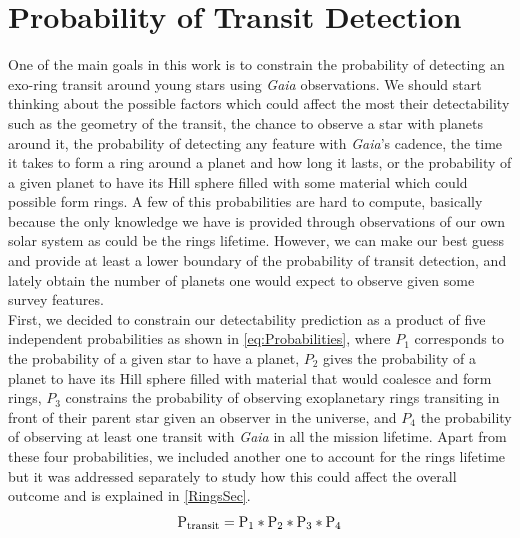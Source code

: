 \section{Probability of Transit Detection}


One of the main goals in this work is to constrain the probability of detecting an exo-ring transit around young stars using \textit{Gaia} observations. We should start thinking about the possible factors which could affect the most their detectability such as the geometry of the transit, the chance to observe a star with planets around it, the probability of detecting any feature with \textit{Gaia}'s cadence, the time it takes to form a ring around a planet and how long it lasts, or the probability of a given planet to have its Hill sphere filled with some material which could possible form rings. A few of this probabilities are hard to compute, basically because the only knowledge we have is provided through observations of our own solar system as could be the rings lifetime. However, we can make our best guess and provide at least a lower boundary of the probability of transit detection, and lately obtain the number of planets one would expect to observe given some survey features.\\

First, we decided to constrain our detectability prediction as a product of five independent probabilities  as shown in \autoref{eq:Probabilities}, where $P_1$ corresponds to the probability of a given star to have a planet, $P_2$ gives the probability of a planet to have its Hill sphere filled with material that would coalesce and form rings, $P_3$ constrains the probability of observing exoplanetary rings transiting in front of their parent star given an observer in the universe, and $P_4$ the probability of observing at least one transit with \textit{Gaia} in all the mission lifetime. Apart from these four probabilities, we included another one to account for the rings lifetime but it was addressed separately to study how this could affect the overall outcome and is explained in \autoref{RingsSec}.\\

\begingroup
\Large
\begin{equation}
 \textnormal{P}_{\textnormal{transit}} = \textnormal{P}_1 * \textnormal{P}_2 * \textnormal{P}_3 * \textnormal{P}_4
 \label{eq:Probabilities}
\end{equation}
\endgroup


